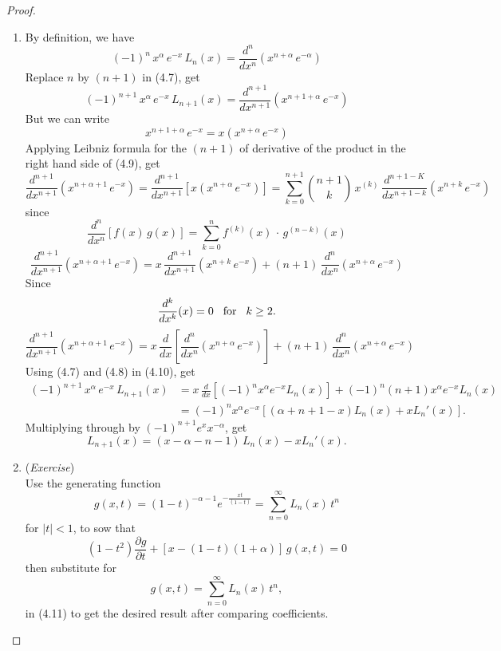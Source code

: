\documentclass[12pt,a4paper]{report}
\theoremstyle{definition}
\theoremstyle{plain}
\begin{document}
\begin{proof}
\begin{enumerate}
\item[(a).] By definition, we have
\begin{equation}
(-1)^n\, x^{\alpha}\, e^{-x}\, L_n(x) = \frac{d^n}{dx^n}\left(x^{n+\alpha}\, e^{-\alpha}\right)
\end{equation}
Replace $n$ by $(n+1)$ in (4.7), get
\begin{equation}
(-1)^{n+1}\, x^{\alpha}\, e^{-x}\, L_{n+1}(x) = \frac{d^{n+1}}{dx^{n+1}}\left(x^{n+1+\alpha}\, e^{-x}\right)
\end{equation}
But we can write
\begin{equation}
x^{n + 1 + \alpha}\, e^{-x} = x\left(x^{n+\alpha}\, e^{-x}\right)
\end{equation}
Applying Leibniz formula for the $(n+1)$ of derivative of the product in the right hand side of (4.9), get
$$\frac{d^{n+1}}{dx^{n+1}}\left(x^{n + \alpha + 1}\, e^{-x}\right) = \frac{d^{n+1}}{dx^{n+1}}\left[x\left(x^{n + \alpha} \, e^{-x}\right)\right] = \sum_{k =0}^{n+1} \binom{n+1}{k}\, x^{(k)}\, \frac{d^{n+1 -K}}{dx^{n+1-k}}\left(x^{n+k}\, e^{-x}\right)$$
since $$\frac{d^n}{dx^n}[f(x)\,g(x)] = \sum_{k=0}^nf^{(k)}(x)\, \cdot\,g^{(n-k)}(x)$$
$$\frac{d^{n+1}}{dx^{n+1}}\left(x^{n + \alpha + 1}\, e^{-x}\right) = x\, \frac{d^{n+1}}{dx^{n+1}}\left(x^{n+k} \, e^{-x}\right) + (n +1) \, \frac{d^n}{dx^n}\left(x^{n+\alpha} \, e^{-x}\right)$$
Since $$\frac{d^k}{dx^k}(x)  = 0\hspace{0.3cm} \text{for}\hspace{0.3cm} k \geq 2.$$
\begin{equation}
\frac{d^{n+1}}{dx^{n+1}}\left(x^{n + \alpha + 1}\, e^{-x}\right) = x\, \frac{d}{dx}\left[\frac{d^n}{dx^n}\left(x^{n+\alpha}\, e^{-x}\right)\right] + (n+1)\, \frac{d^n}{dx^n}\left(x^{n+\alpha}\, e^{-x}\right)
\end{equation}
Using (4.7) and (4.8) in (4.10), get
\begin{align*}
(-1)^{n+1}\, x^{\alpha}\, e^{-x}\, L_{n+1}(x) & = x\, \frac{d}{dx}\left[(-1)^n x^{\alpha} e^{-x}L_n(x)\right] + (-1)^n(n+1) x^{\alpha} e^{-x} L_n(x)\\
& = (-1)^nx^{\alpha}e^{-x}\left[(\alpha + n + 1 -x) L_n(x) + x L_n'(x)\right].
\end{align*}
Multiplying through by $(-1)^{n+1}e^xx^{-\alpha}$, get 
$$L_{n+1}(x) = (x - \alpha -n -1)\, L_n(x) - xL_n'(x).$$


\item[(b).] (\textit{Exercise})\\
Use the generating function $$g(x,t) = (1 - t)^{-\alpha -1}e^{-\frac{xt}{(1 - t)}} = \sum_{n=0}^{\infty} L_n(x)\, t^n$$ for $|t| <1$, to sow that 
\begin{equation}
(1 -t^2)\frac{\partial g}{\partial t} + [x - (1-t)(1 +\alpha)]\, g(x,t) = 0
\end{equation}
then substitute for $$g(x,t) = \sum_{n=0}^{\infty} L_n(x)\, t^n,$$ in (4.11) to get the desired result after comparing coefficients.
\end{enumerate}
\end{proof}
\end{document}
